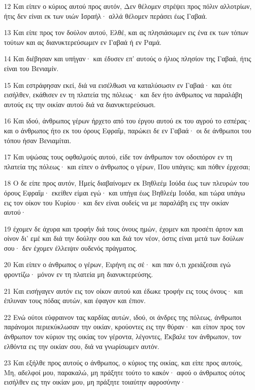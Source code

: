 \par 12 Και είπεν ο κύριος αυτού προς αυτόν, Δεν θέλομεν στρέψει προς πόλιν αλλοτρίων, ήτις δεν είναι εκ των υιών Ισραήλ· αλλά θέλομεν περάσει έως Γαβαά.
\par 13 Και είπε προς τον δούλον αυτού, Ελθέ, και ας πλησιάσωμεν εις ένα εκ των τόπων τούτων και ας διανυκτερεύσωμεν εν Γαβαά ή εν Ραμά.
\par 14 Και διέβησαν και υπήγαν· και έδυσεν επ' αυτούς ο ήλιος πλησίον της Γαβαά, ήτις είναι του Βενιαμίν.
\par 15 Και εστράφησαν εκεί, διά να εισέλθωσι να καταλύσωσιν εν Γαβαά· και ότε εισήλθεν, εκάθισεν εν τη πλατεία της πόλεως· και δεν ήτο άνθρωπος να παραλάβη αυτούς εις την οικίαν αυτού διά να διανυκτερεύσωσι.
\par 16 Και ιδού, άνθρωπος γέρων ήρχετο από του έργου αυτού εκ του αγρού το εσπέρας· και ο άνθρωπος ήτο εκ του όρους Εφραΐμ, παρώκει δε εν Γαβαά· οι δε άνθρωποι του τόπου ήσαν Βενιαμίται.
\par 17 Και υψώσας τους οφθαλμούς αυτού, είδε τον άνθρωπον τον οδοιπόρον εν τη πλατεία της πόλεως· και είπεν ο άνθρωπος ο γέρων, Που υπάγεις; και πόθεν έρχεσαι;
\par 18 Ο δε είπε προς αυτόν, Ημείς διαβαίνομεν εκ Βηθλεέμ Ιούδα έως των πλευρών του όρους Εφραΐμ· εκείθεν είμαι εγώ· και υπήγα έως Βηθλεέμ Ιούδα, και τώρα υπάγω εις τον οίκον του Κυρίου· και δεν είναι ουδείς να με παραλάβη εις την οικίαν αυτού·
\par 19 έχομεν δε άχυρα και τροφήν διά τους όνους ημών, έχομεν και προσέτι άρτον και οίνον δι' εμέ και διά την δούλην σου και διά τον νέον, όστις είναι μετά των δούλων σου· δεν έχομεν έλλειψιν ουδενός πράγματος.
\par 20 Και είπεν ο άνθρωπος ο γέρων, Ειρήνη εις σέ· και παν ό,τι χρειάζεσαι εγώ φροντίζω· μόνον εν τη πλατεία μη διανυκτερεύσης.
\par 21 Και εισήγαγεν αυτόν εις τον οίκον αυτού και έδωκε τροφήν εις τους όνους· και έπλυναν τους πόδας αυτών, και έφαγον και έπιον.
\par 22 Ενώ ούτοι εύφραινον τας καρδίας αυτών, ιδού, οι άνδρες της πόλεως, άνθρωποι παράνομοι περιεκύκλωσαν την οικίαν, κρούοντες εις την θύραν· και είπον προς τον άνθρωπον τον κύριον της οικίας τον γέροντα, λέγοντες, Έκβαλε τον άνθρωπον, τον ελθόντα εις την οικίαν σου, διά να γνωρίσωμεν αυτόν.
\par 23 Και εξήλθε προς αυτούς ο άνθρωπος, ο κύριος της οικίας, και είπε προς αυτούς, Μη, αδελφοί μου, παρακαλώ, μη πράξητε τούτο το κακόν· αφού ο άνθρωπος ούτος εισήλθεν εις την οικίαν μου, μη πράξητε τοιαύτην αφροσύνην·
